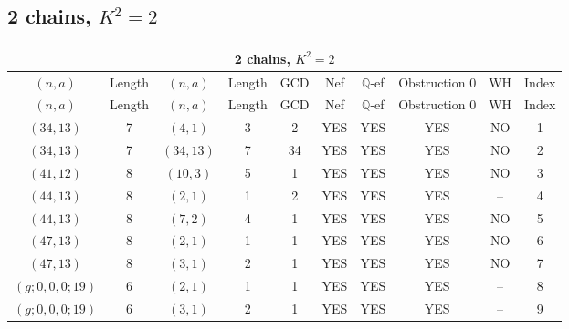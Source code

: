 \subsection{2 chains, $K^2 = 2$}
\begin{longtable}{|c|c|c|c|c|c|c|c|c|c|}
\hline
\multicolumn{10}{|c|}{2 chains, $K^2 = 2$}\\
\hline
$(n,a)$ & Length & $(n,a)$ & Length & GCD & Nef & $\mathbb Q$-ef & Obstruction 0 & WH & Index\\
\hline
\endfirsthead

\hline
$(n,a)$ & Length & $(n,a)$ & Length & GCD & Nef & $\mathbb Q$-ef & Obstruction 0 & WH & Index\\
\hline
\endhead
\hline
\endfoot

$(34, 13)$ & 7 & $(4, 1)$ & 3 & 2 & YES & YES & YES & NO & 1\\
$(34, 13)$ & 7 & $(34, 13)$ & 7 & 34 & YES & YES & YES & NO & 2\\
$(41, 12)$ & 8 & $(10, 3)$ & 5 & 1 & YES & YES & YES & NO & 3\\
$(44, 13)$ & 8 & $(2, 1)$ & 1 & 2 & YES & YES & YES & -- & 4\\
$(44, 13)$ & 8 & $(7, 2)$ & 4 & 1 & YES & YES & YES & NO & 5\\
$(47, 13)$ & 8 & $(2, 1)$ & 1 & 1 & YES & YES & YES & NO & 6\\
$(47, 13)$ & 8 & $(3, 1)$ & 2 & 1 & YES & YES & YES & NO & 7\\
$(g; 0, 0, 0; 19)$ & 6 & $(2, 1)$ & 1 & 1 & YES & YES & YES & -- & 8\\
$(g; 0, 0, 0; 19)$ & 6 & $(3, 1)$ & 2 & 1 & YES & YES & YES & -- & 9
\end{longtable}
